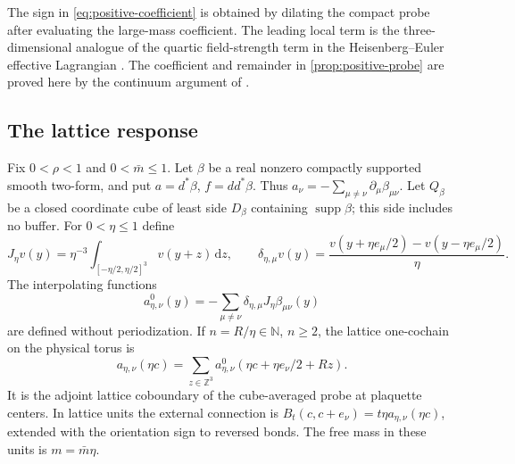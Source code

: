 \documentclass[11pt,letterpaper,reqno]{amsart}
\newcommand{\Z}{\mathbb Z}
\newcommand{\N}{\mathbb N}
\newcommand{\dd}{\mathrm d}
\DeclareMathOperator{\supp}{supp}
\begin{document}
The sign in \eqref{eq:positive-coefficient} is obtained by dilating
the compact probe after evaluating the large-mass coefficient.
The leading local term is the three-dimensional analogue of the
quartic field-strength term in the Heisenberg--Euler effective
Lagrangian \cite{HeisenbergEuler1936}. The coefficient and remainder
in \cref{prop:positive-probe} are proved here by the continuum
argument of \cite[\S17]{QED3Master}.

\subsection{The lattice response}\label{subsec:response-conventions}

Fix $0<\rho<1$ and $0<\bar m\le1$. Let $\beta$ be a real nonzero compactly
supported smooth two-form, and put $a=d^*\beta$, $f=dd^*\beta$.
Thus $a_\nu=-\sum_{\mu\ne\nu}\partial_\mu\beta_{\mu\nu}$.
Let $Q_\beta$ be a closed coordinate cube of least side $D_\beta$
containing $\supp\beta$; this side includes no buffer. For $0<\eta\le1$
define
\[
 J_\eta v(y)=\eta^{-3}\int_{[-\eta/2,\eta/2]^3}v(y+z)\,\dd z,
 \qquad
 \delta_{\eta,\mu}v(y)=
      \frac{v(y+\eta e_\mu/2)-v(y-\eta e_\mu/2)}{\eta}.
\]
The interpolating functions
\begin{equation}\label{eq:response-lattice-probe}
 a_{\eta,\nu}^0(y)=-\sum_{\mu\ne\nu}
               \delta_{\eta,\mu}J_\eta\beta_{\mu\nu}(y)
\end{equation}
are defined without periodization. If $n=R/\eta\in\N$, $n\ge2$,
the lattice one-cochain on the physical torus is
\begin{equation}\label{eq:response-periodic-probe}
 a_{\eta,\nu}(\eta c)=\sum_{z\in\Z^3}
       a_{\eta,\nu}^0(\eta c+\eta e_\nu/2+Rz).
\end{equation}
It is the adjoint lattice coboundary of the cube-averaged probe
at plaquette centers. In lattice units the external connection
is $B_t(c,c+e_\nu)=t\eta a_{\eta,\nu}(\eta c)$, extended with
the orientation sign to reversed bonds. The free mass in
these units is $m=\bar m\eta$.
\end{document}
